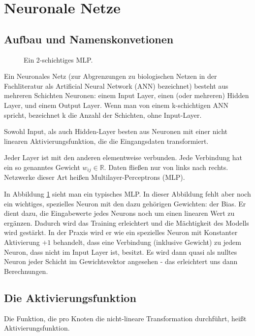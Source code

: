 \section{Neuronale Netze} %

\subsection{Aufbau und Namenskonvetionen}
\begin{figure}[ht!]
\label{fig:MLP}
  \centering
    
  \caption{Ein 2-schichtiges MLP.}
\end{figure}


Ein Neuronales Netz (zur Abgrenzungen zu biologischen Netzen in der Fachliteratur als Artificial Neural Network (ANN) bezeichnet) besteht aus mehreren Schichten Neuronen: einem Input Layer, einen (oder mehreren) Hidden Layer, und einem Output Layer. 
Wenn man von einem k-schichtigen ANN spricht, bezeichnet k die Anzahl der Schichten, ohne Input-Layer.

Sowohl Input, als auch Hidden-Layer besten aus Neuronen mit einer nicht linearen Aktivierungsfunktion, die die Eingangsdaten transformiert.

Jeder Layer ist mit den anderen elementweise verbunden. Jede Verbindung hat ein so genanntes Gewicht $w_{ij} \in \mathbb{R}$. Daten fließen nur von links nach rechts. Netzwerke dieser Art heißen Multilayer-Perceptrons (MLP). 

In Abbildung \ref{fig:MLP} sieht man ein typisches MLP. In dieser Abbildung fehlt aber noch ein wichtiges, spezielles Neuron mit den dazu gehörigen Gewichten: der Bias. Er dient dazu, die Eingabewerte jedes Neurons noch um einen linearen Wert zu ergänzen. Dadurch wird das Training erleichtert und die Mächtigkeit des Modells wird gestärkt. In der Praxis wird er wie ein spezielles Neuron mit Konstanter Aktivierung $+1$ behandelt, dass eine Verbindung (inklusive Gewicht) zu jedem Neuron, dass nicht im Input Layer ist, besitzt. Es wird dann quasi als nulltes Neuron jeder Schicht im Gewichtsvektor angesehen - das erleichtert uns dann Berechnungen.
 

\subsection{Die Aktivierungsfunktion}

Die Funktion, die pro Knoten die nicht-lineare Transformation durchführt, heißt Aktivierungsfunktion. 

